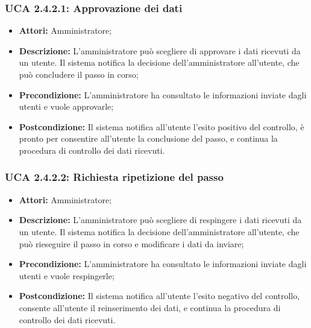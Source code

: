 \hypertarget{A2.4.2.1}{}
\subsubsection{UCA 2.4.2.1: Approvazione dei dati}
\begin{itemize}
\item \textbf{Attori:}
Amministratore;
\item \textbf{Descrizione:}
L'amministratore può scegliere di approvare i dati ricevuti da un utente. Il sistema notifica la decisione dell'amministratore all'utente, che può concludere il passo in corso;
\item \textbf{Precondizione:}
L'amministratore ha consultato le informazioni inviate dagli utenti e vuole approvarle;
\item \textbf{Postcondizione:}
Il sistema notifica all'utente l'esito positivo del controllo, è pronto per consentire all'utente la conclusione del passo, e continua la procedura di controllo dei dati ricevuti.
\end{itemize}

\hypertarget{A2.4.2.2}{}
\subsubsection{UCA 2.4.2.2: Richiesta ripetizione del passo}
\begin{itemize}
\item \textbf{Attori:}
Amministratore;
\item \textbf{Descrizione:}
L'amministratore può scegliere di respingere i dati ricevuti da un utente. Il sistema notifica la decisione dell'amministratore all'utente, che può rieseguire il passo in corso e modificare i dati da inviare;
\item \textbf{Precondizione:}
L'amministratore ha consultato le informazioni inviate dagli utenti e vuole respingerle;
\item \textbf{Postcondizione:}
Il sistema notifica all'utente l'esito negativo del controllo, consente all'utente il reinserimento dei dati, e continua la procedura di controllo dei dati ricevuti.
\end{itemize}

\hypertarget{A2.5}{}
